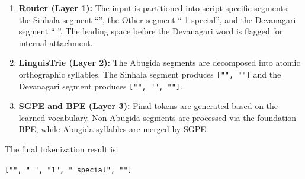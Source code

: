 \begin{enumerate}
    \item \textbf{Router (Layer 1):} The input is partitioned into script-specific segments: the Sinhala segment ``'', the Other segment `` 1 special'', and the Devanagari segment `` ''. The leading space before the Devanagari word is flagged for internal attachment.
    \item \textbf{LinguisTrie (Layer 2):} The Abugida segments are decomposed into atomic orthographic syllables. The Sinhala segment produces \texttt{["", ""]} and the Devanagari segment produces \texttt{["", "", ""]}.
    \item \textbf{SGPE and BPE (Layer 3):} Final tokens are generated based on the learned vocabulary. Non-Abugida segments are processed via the foundation BPE, while Abugida syllables are merged by SGPE.
\end{enumerate}

The final tokenization result is:
\begin{center}
\texttt{["", " ", "1", " special", ""]}
\end{center}
